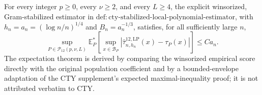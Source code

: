For every integer \(p\geq0\), every \(\nu\geq2\), and every \(L\geq4\), the explicit winsorized, Gram-stabilized estimator in \(\mathrm{def:cty\text{-}stabilized\text{-}local\text{-}polynomial\text{-}estimator}\), with \(h_n=a_n=(\log n/n)^{1/4}\) and \(B_n=a_n^{-1/3}\), satisfies, for all sufficiently large \(n\),
\[
 \sup_{P\in\mathcal P_{12}(p,\nu,L)}
 \mathbb E_P^*\!\left[
 \sup_{x\in\mathcal B_P}
 |\widehat\tau^{12,\mathrm{LP}}_{n,h_n}(x)-\tau_P(x)|
 \right]
 \leq Ca_n.
\]
The expectation theorem is derived by comparing the winsorized empirical score directly with the original population coefficient and by a bounded-envelope adaptation of the CTY supplement's expected maximal-inequality proof; it is not attributed verbatim to CTY.